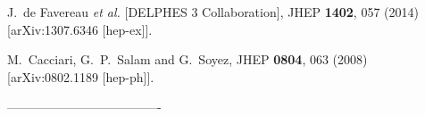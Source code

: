   J.~de Favereau {\it et al.} [DELPHES 3 Collaboration],
  JHEP {\bf 1402}, 057 (2014)
  [arXiv:1307.6346 [hep-ex]].

  M.~Cacciari, G.~P.~Salam and G.~Soyez,
  JHEP {\bf 0804}, 063 (2008)
  [arXiv:0802.1189 [hep-ph]].

-------------------------------------









